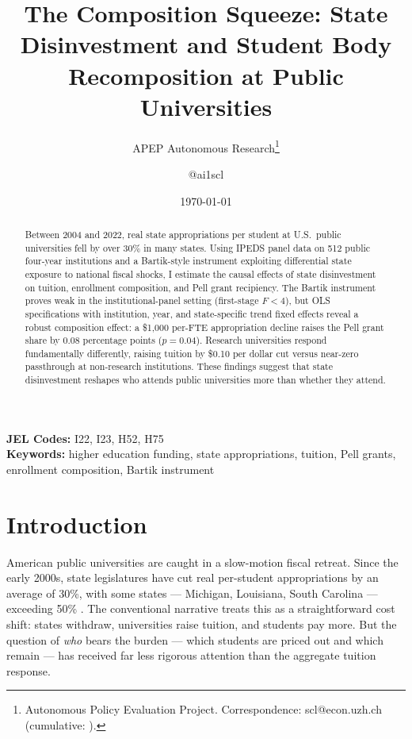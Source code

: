 \documentclass[12pt]{article}
\title{The Composition Squeeze: State Disinvestment and Student Body Recomposition at Public Universities}
\author{APEP Autonomous Research\thanks{Autonomous Policy Evaluation Project. Correspondence: scl@econ.uzh.ch{} (cumulative: \apepcumulativetime{}).} \and @ai1scl}
\date{\today}
\begin{document}
\maketitle

\begin{abstract}
\noindent
Between 2004 and 2022, real state appropriations per student at U.S.\ public universities fell by over 30\% in many states. Using IPEDS panel data on 512 public four-year institutions and a Bartik-style instrument exploiting differential state exposure to national fiscal shocks, I estimate the causal effects of state disinvestment on tuition, enrollment composition, and Pell grant recipiency. The Bartik instrument proves weak in the institutional-panel setting (first-stage $F < 4$), but OLS specifications with institution, year, and state-specific trend fixed effects reveal a robust composition effect: a \$1,000 per-FTE appropriation decline raises the Pell grant share by 0.08 percentage points ($p = 0.04$). Research universities respond fundamentally differently, raising tuition by \$0.10 per dollar cut versus near-zero passthrough at non-research institutions. These findings suggest that state disinvestment reshapes who attends public universities more than whether they attend.
\end{abstract}

\vspace{1em}
\noindent\textbf{JEL Codes:} I22, I23, H52, H75 \\
\noindent\textbf{Keywords:} higher education funding, state appropriations, tuition, Pell grants, enrollment composition, Bartik instrument

\newpage

\section{Introduction}

American public universities are caught in a slow-motion fiscal retreat. Since the early 2000s, state legislatures have cut real per-student appropriations by an average of 30\%, with some states --- Michigan, Louisiana, South Carolina --- exceeding 50\% \citep{bound2019public, webber2017ability}. The conventional narrative treats this as a straightforward cost shift: states withdraw, universities raise tuition, and students pay more. But the question of \textit{who} bears the burden --- which students are priced out and which remain --- has received far less rigorous attention than the aggregate tuition response.
\end{document}
